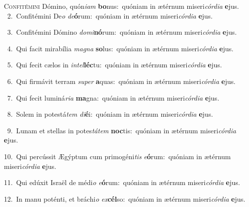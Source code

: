 \lettrine{\initial\textcolor{\initialcolor}{C}}{onfitémini} Dómino, quón\-\textit{i}\-\textit{am} \textbf{bo}\-nus:~\star quóniam in ætérnum miseri\-\textit{cór}\-\textit{di}\textit{a} \textbf{e}\-jus.\\
{\numbfont\textcolor{\numbcolor}{~2.}}~Confitémini De\textit{o} \textit{de}\-\textbf{ó}rum:~\star quóniam in ætérnum miseri\-\textit{cór}\-\textit{di}\textit{a} \textbf{e}\-jus.\par
{\numbfont\textcolor{\numbcolor}{~3.}}~Confitémini Dómino \textit{do}\-\textit{mi}\textbf{nó}rum:~\star quóniam in ætérnum miseri\-\textit{cór}\-\textit{di}\textit{a} \textbf{e}\-jus.\par
{\numbfont\textcolor{\numbcolor}{~4.}}~Qui facit mirabília \textit{ma}\-\textit{gna} \textbf{so}\-lus:~\star quóniam in ætérnum miseri\-\textit{cór}\-\textit{di}\textit{a} \textbf{e}\-jus.\par
{\numbfont\textcolor{\numbcolor}{~5.}}~Qui fecit cælos in \textit{in}\-\textit{tel}\textbf{léc}tu:~\star quóniam in ætérnum miseri\-\textit{cór}\-\textit{di}\textit{a} \textbf{e}\-jus.\par
{\numbfont\textcolor{\numbcolor}{~6.}}~Qui firmávit terram \textit{su}\-\textit{per} \textbf{a}\-quas:~\star quóniam in ætérnum miseri\-\textit{cór}\-\textit{di}\textit{a} \textbf{e}\-jus.\par
{\numbfont\textcolor{\numbcolor}{~7.}}~Qui fecit luminá\-\textit{ri}\-\textit{a} \textbf{ma}\-gna:~\star quóniam in ætérnum miseri\-\textit{cór}\-\textit{di}\textit{a} \textbf{e}\-jus.\par
{\numbfont\textcolor{\numbcolor}{~8.}}~Solem in potestá\textit{tem} \textit{di}\-\textbf{é}i:~\star quóniam in ætérnum miseri\-\textit{cór}\-\textit{di}\textit{a} \textbf{e}\-jus.\par
{\numbfont\textcolor{\numbcolor}{~9.}}~Lunam et stellas in potes\-\textit{tá}\-\textit{tem} \textbf{noc}\-tis:~\star quóniam in ætérnum miseri\-\textit{cór}\-\textit{di}\textit{a} \textbf{e}\-jus.\par
{\numbfont\textcolor{\numbcolor}{10.}}~Qui percússit Ægýptum cum primogéni\textit{tis} \textit{e}\-\textbf{ó}rum:~\star quóniam in ætérnum miseri\-\textit{cór}\-\textit{di}\textit{a} \textbf{e}\-jus.\par
{\numbfont\textcolor{\numbcolor}{11.}}~Qui edúxit Israël de médi\textit{o} \textit{e}\-\textbf{ó}rum:~\star quóniam in ætérnum miseri\-\textit{cór}\-\textit{di}\textit{a} \textbf{e}\-jus.\par
{\numbfont\textcolor{\numbcolor}{12.}}~In manu poténti, et bráchi\textit{o} \textit{ex}\-\textbf{cél}so:~\star quóniam in ætérnum miseri\-\textit{cór}\-\textit{di}\textit{a} \textbf{e}\-jus.\par
